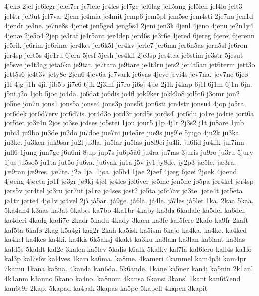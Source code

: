 4jek^^f8
2jel
je6legr
jelei7er
je7lele
je4les
jel7ge
jel6lag
jell5ang
jel5len
jel4lo
jelt3
jel4tr
jel9ut
jel7va.
2jem
je4mia
je4mit
jemp6
jem5pl
jem5se
jem4sti
2je7na
jen1d
4jendr
je3ne.
je7ne8s
4jenet
jen5ged
jeng5s4
2jeni
jen3k
4jenl
4jeno
4jenu
je2n1y4
4jen^^e6
2je5o4
2jep
je3raf
je4r5ant
jer4dep
jerd6s
je3r6e
4jered
6jereg
6jerei
6jerenn
je5rik
je6rim
je6rin^^e6
jer4kes
jer6k5l
jer4kv
jerle7
jer6mu
jer6n5as
jern5sl
je6ron
jer4sp
jert5s
4je1ru
6jer^^e5
5jesf
5jesh
jes4kil
2je3sp
jes4tea
je6stim
je3str
5jesut
je5sve
je4t3ag
jeta6ka
je9tar.
je7tara
je9tare
je4t3ru
jets2
jet4t5an
jet6term
jett3o
jett5s6
je4t3v
jety8e
2jeu6
4jev6a
je7vark
je6vas
4jeve
jevi4s
jev7na.
jev7ne
6je^^f8
j1f
4jg
j1h
4ji.
jib5b
ji7e6
6jik
2j3inf
ji7ro
ji6sj
4ji^^f8
2j1k
j4kap
6j1l
6j1m
6j1n
6jn.
j5ni
j2o
1job
5joc
jo4da.
jo6dat
jo6dis
jo4fl
jok9ker
jokk9o8
jol5t6
j3omr
jon2
jo5ne
jon7n
jons1
jons5a
jonse4
jons3p
jons5t
jon6sti
jon4str
jonsu4
4jop
jo5ra
jor6dek
jor6d7erv
jor6d7is.
jor4d3o
jord3r
jord5s
jords4l
jor6du
jo1re
jo4rie
jort6a
jor5tet
jo3r4u
2jos
jo3se
jo4ses
jo5stei
1jou
jour5
j1p
4j1r
2j3s2
j1t
ju8are
1jub
jubi3
ju9bo
ju3de
ju2do
ju7doe
jue7ni
ju4e5re
jue9s
jug9le
5jugo
4ju2k
ju3ka
ju3ke.
ju3ken
juk9sar
ju2l
ju3la.
ju5lar
ju5las
ju8l9ei
ju4li.
ju6lid
ju4lik
jul7inn
jull6
1jung
jun7ge
j6u6ni
8jup
jup7s
ju6p5^^e56
ju4ra
ju7ras
3juris
ju9ro
ju3ru
5jury
1jus
ju5so5
ju1ta
jut5o
ju6va.
ju6vak
ju1^^e5
j5v
jy1
jy8de.
jy2p3
j^^e65le.
j^^e63ra.
j^^e69ran
j^^e69res.
j^^e67te.
j2^^f8
1j^^f8.
1j^^f8a.
j^^f85b4
1j^^f8e
2j^^f8ef
4j^^f8eg
6j^^f8ei
2j^^f8ek
4j^^f8end
4j^^f8eng
4j^^f8eta
j^^f81f
j^^f83gr
j^^f89kj
4j^^f8l
j^^f84les
j^^f8l6ver
j^^f85me
j^^f8n5ne
j^^f85pa
j^^f8r4kel
j^^f8r4sp
j^^f8rs5v
j^^f8r4tel
j^^f83ru
j^^f8r7ut
j^^f81r^^f8
j^^f84ses
j^^f8st2
j^^f85ta
j^^f86t7av
j^^f83te.
j^^f8te4t
j^^f8t5eta
j^^f81tr
j^^f8tte4
4j^^f81v
j^^f84vel
2j^^e5
j^^e55ar.
j^^e59ge.
j^^e56la.
j^^e54le.
j^^e57les
j^^e55let
1ka.
2kaa
5kaa.
5ka4an4
k3aas
ka3at
6kabes
ka7bo
4ka1br
4kaby
ka3da
6kadale
ka5del
ka6del.
ka4deri
4kadg
kadi7e
2kadr
5kadu
4kady
3kaen
ka3fe
kaf5fere
2kafo
ka9fr
2kaft
kaf5ta
6kaf^^f8
2kag
k5a4gi
kag2r
2kah
ka5isk
ka5ism
6kajo
ka4ka.
ka4ke.
ka4ked
ka4kel
ka4kes
ka4ki.
ka4kis
6k5aksj
4kakt
ka3ku
ka3lam
ka3lan
ka6lant
ka3las
kald5s
5kaldt
kal2e
3kalen
ka5lev
5kalis
k6alk
5kalky
kal7la
kal6lero
kall4s
ka1lo
kal3p
kal7s6v
kal4ves
1kam
ka6ma.
ka8me.
4kameri
4kammel
kam4p3i
kam4pr
7kamu
1kana
ka8na.
4kanda
kan6da.
5k6ande.
1kane
ka5ner
kan4i
ka5nin
2k1anl
4k1anm
k3anno
5kano
ka4no.
ka8nom
4kansa
6kansi
3kansl
1kant
kan6t7end
kan6t9r
2kap.
5kapad
ka4pak
3kapas
ka5pe
5kapell
4kapen
3kapit
